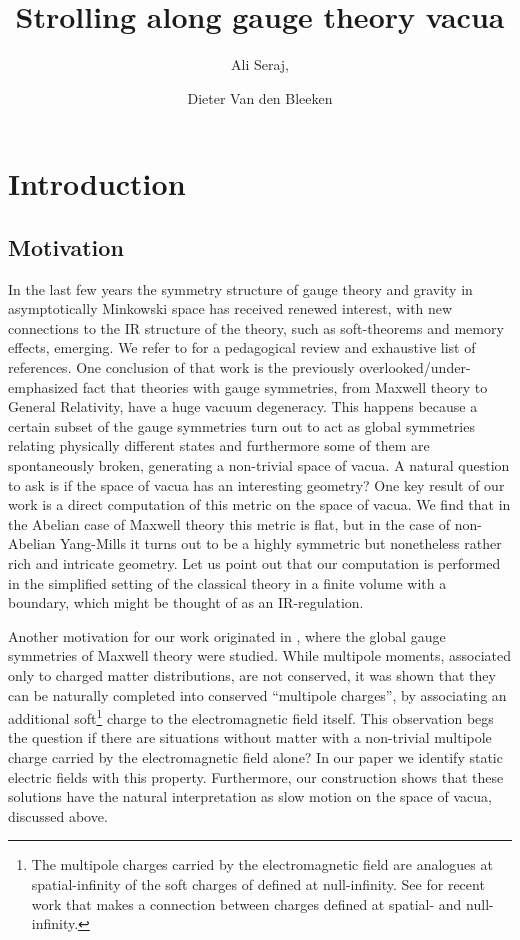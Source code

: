 \documentclass[11pt,a4paper]{article}
\title{\boldmath Strolling along gauge theory vacua}
\author[a]{Ali Seraj,}
\author[b,c]{Dieter Van den Bleeken}
\affiliation[a]{Institute for Research in Fundamental Sciences (IPM),\\P.O.Box 19395-5531,Tehran, IRAN}
\affiliation[b]{Primary address\\
 Physics Department, Bo\u{g}azi\c{c}i University\\
 34342 Bebek / Istanbul, Turkey}
\affiliation[c]{Secondary address\\
Institute for Theoretical Physics, KU Leuven\\
3001 Leuven, Belgium}
\begin{document}
    \maketitle
    \flushbottom       
    
    \section{Introduction}
   
    \subsection{Motivation}
    In the last few years the symmetry structure of gauge theory and gravity in asymptotically Minkowski space has received renewed interest, with new connections to the IR structure of the theory, such as soft-theorems and memory effects, emerging. We refer to \cite{Strominger:2017zoo} for a pedagogical review and exhaustive list of references.
    One conclusion of that work is the previously overlooked/under-emphasized fact that theories with gauge symmetries, from Maxwell theory to General Relativity, have a huge vacuum degeneracy. This happens because a certain subset of the gauge symmetries turn out to act as global symmetries relating physically different states and furthermore some of them are spontaneously broken, generating a non-trivial space of vacua.  A natural question to ask is if the space of vacua has an interesting geometry? One key result of our work is a direct computation of this metric on the space of vacua. We find that in the Abelian case of Maxwell theory this metric is flat, but in the case of non-Abelian Yang-Mills it turns out to be a highly symmetric but nonetheless rather rich and intricate geometry. Let us point out that our computation is performed in the simplified setting of the classical theory in a finite volume with a boundary, which might be thought of as an IR-regulation.  
    
    Another motivation for our work originated in \cite{Seraj:2016jxi}, where the global gauge symmetries of Maxwell theory were studied.  While multipole moments, associated only to charged matter distributions, are not conserved, it was shown that they can be naturally completed into conserved ``multipole charges'', by associating an additional soft\footnote{The multipole charges carried by the electromagnetic field are analogues at spatial-infinity of the soft charges of \cite{Strominger:2013lka, Barnich:2013sxa} defined at null-infinity. See \cite{Campiglia:2017mua} for recent work that makes a connection between charges defined at spatial- and null- infinity.} charge to the electromagnetic field itself. This observation begs the question if there are situations without matter with a non-trivial multipole charge carried by the electromagnetic field alone? In our paper we identify static electric fields with this property. Furthermore, our construction shows that these solutions have the natural interpretation as slow motion on the space of vacua, discussed above.  
    
\end{document}
